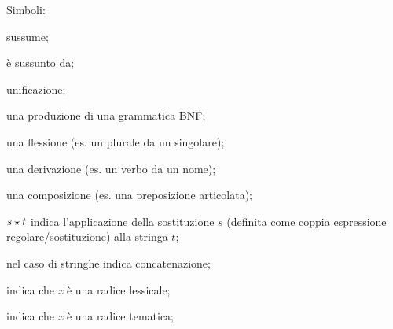 \startnote

Simboli:
        
\begin{itemize*}        
\item[\spzsussume] sussume;
\item[\spzsussunto] è sussunto da;
\item[\spzunify] unificazione;
\item[\spzbnf] una produzione di una grammatica BNF;
\item[\spzder] una flessione (es.  un plurale da un singolare);
\item[\spzlessder] una derivazione (es.  un verbo da un nome);
\item[\spzcompder] una composizione (es. una preposizione articolata);
\item[$s\star t$] indica l'applicazione della sostituzione $s$
  (definita come coppia espressione regolare/sostituzione) alla
  stringa $t$;
\item[\spzconcat] nel caso di stringhe indica concatenazione;
\item[\spzradless{{\it x}}] indica che {\it x} è una radice lessicale;
\item[\spzradtema{{\it x}}] indica che {\it x} è una radice tematica;
\end{itemize*}

